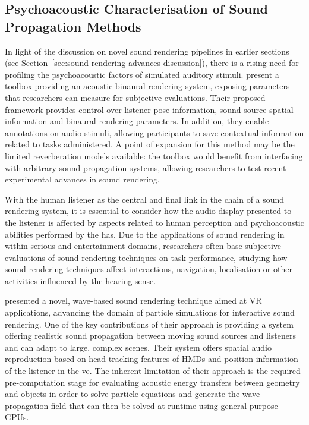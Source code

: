 \subsection{Psychoacoustic Characterisation of Sound Propagation Methods}
In light of the discussion on novel sound rendering pipelines in earlier sections (see Section~\ref{sec:sound-rendering-advances-discussion}), there is a rising need for profiling the psychoacoustic factors of simulated auditory stimuli. \cite{gonzalez2023binaural} present a toolbox providing an acoustic binaural rendering system, exposing parameters that researchers can measure for subjective evaluations. Their proposed framework provides control over listener pose information, sound source spatial information and binaural rendering parameters. In addition, they enable annotations on audio stimuli, allowing participants to save contextual information related to tasks administered. A point of expansion for this method may be the limited reverberation models available: the toolbox would benefit from interfacing with arbitrary sound propagation systems, allowing researchers to test recent experimental advances in sound rendering.\par
With the human listener as the central and final link in the chain of a sound rendering system, it is essential to consider how the audio display presented to the listener is affected by aspects related to human perception and psychoacoustic abilities performed by the \acrshort{has}. Due to the applications of sound rendering in  within serious and entertainment domains, researchers often base subjective evaluations of sound rendering techniques on task performance, studying how sound rendering techniques affect interactions, navigation, localisation or other activities influenced by the hearing sense.\par
\cite{mehra2015wave} presented a novel, wave-based sound rendering technique aimed at VR applications, advancing the domain of particle simulations for interactive sound rendering. One of the key contributions of their approach is providing a system offering realistic sound propagation between moving sound sources and listeners and can adapt to large, complex scenes. Their system offers spatial audio reproduction based on head tracking features of HMDs and position information of the listener in the \acrshort{ve}. The inherent limitation of their approach is the required pre-computation stage for evaluating acoustic energy transfers between geometry and objects in order to solve particle equations and generate the wave propagation field that can then be solved at runtime using general-purpose GPUs.\par
